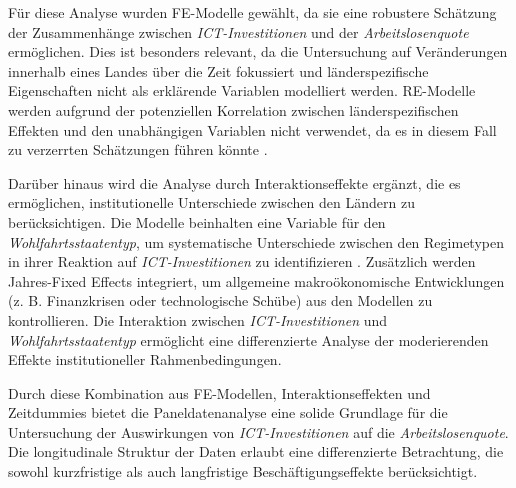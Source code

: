 Für diese Analyse wurden \ac{FE}-Modelle gewählt, da sie eine robustere Schätzung der 
Zusammenhänge zwischen \textit{\ac{ICT}-Investitionen} und der \textit{Arbeitslosenquote} 
ermöglichen. Dies ist besonders relevant, da die Untersuchung auf Veränderungen innerhalb 
eines Landes über die Zeit fokussiert und länderspezifische Eigenschaften nicht als erklärende 
Variablen modelliert werden. \ac{RE}-Modelle werden aufgrund der potenziellen Korrelation 
zwischen länderspezifischen Effekten und den unabhängigen Variablen nicht verwendet, da es in 
diesem Fall zu verzerrten Schätzungen führen könnte 
\parencite[S. 251–256]{wooldridge2010econometric}. 

Darüber hinaus wird die Analyse durch Interaktionseffekte ergänzt, die es ermöglichen, 
institutionelle Unterschiede zwischen den Ländern zu berücksichtigen. Die Modelle beinhalten 
eine Variable für den \textit{Wohlfahrtsstaatentyp}, um systematische Unterschiede zwischen den 
Regimetypen in ihrer Reaktion auf \textit{\ac{ICT}-Investitionen} zu identifizieren 
\parencite{espingandersen1990thethree}. Zusätzlich werden Jahres-Fixed Effects integriert, um 
allgemeine makroökonomische Entwicklungen (z. B. Finanzkrisen oder technologische Schübe) aus 
den Modellen zu kontrollieren. Die Interaktion zwischen \textit{\ac{ICT}-Investitionen} und 
\textit{Wohlfahrtsstaatentyp} ermöglicht eine differenzierte Analyse der moderierenden Effekte 
institutioneller Rahmenbedingungen.

Durch diese Kombination aus \ac{FE}-Modellen, Interaktionseffekten und Zeitdummies bietet die
Paneldatenanalyse eine solide Grundlage für die Untersuchung der Auswirkungen von 
\textit{\ac{ICT}-Investitionen} auf die \textit{Arbeitslosenquote}. Die longitudinale Struktur 
der Daten erlaubt eine differenzierte Betrachtung, die sowohl kurzfristige als auch 
langfristige Beschäftigungseffekte berücksichtigt. 
